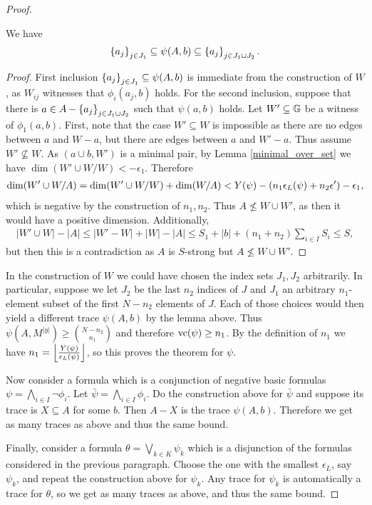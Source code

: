 \begin{proof}
  \begin{Lemma} We have
    \begin{align*}
      \left\{a_j\right\}_{j \in J_1} \subseteq \psi(A, b) \subseteq \left\{a_j\right\}_{j \in J_1 \cup J_2}.
    \end{align*}
  \end{Lemma}
  \begin{proof}
    First inclusion $\left\{a_j\right\}_{j \in J_1} \subseteq \psi(A, b)$ is immediate from the construction of $W$,
    as $W_{ij}$ witnesses that $\phi_i(a_j, b)$ holds.
    For the second inclusion, suppose that there is $a \in A - \left\{a_j\right\}_{j \in J_1 \cup J_2}$ such that $\psi(a,b)$ holds.
    Let $W' \subseteq \mathbb G$ be a witness of $\phi_1(a,b)$.
    First, note that the case $W' \subseteq W$ is impossible
    as there are no edges between $a$ and $W - a$, but there are edges between $a$ and $W' - a$.
    Thus assume $W' \not\subseteq W$.
    As $(a \cup b, W')$ is a minimal pair, by Lemma \ref{minimal_over_set} we have $\dim (W' \cup W / W) < -\epsilon_1$.
    Therefore
    \begin{align*}
      \dim(W' \cup W / A) = \dim (W' \cup W / W) + \dim(W/A) < Y(\psi) - \left(n_1 \epsilon_L(\psi) + n_2 \epsilon'\right) - \epsilon_1,
    \end{align*}
    which is negative by the construction of $n_1, n_2$.
    Thus $A \not\leq W \cup W'$, as then it would have a positive dimension.
    Additionally,
    \begin{align*}
      |W' \cup W| - |A| \leq |W' - W| + |W| - |A| \leq S_1 + |b| + (n_1 + n_2) \sum_{i \in I} S_i \leq S,
    \end{align*}
    but then this is a contradiction as $A$ is $S$-strong but $A \not\leq W \cup W'$.
  \end{proof}

  In the construction of $W$ we could have chosen the index sets $J_1, J_2$ arbitrarily.
  In particular, suppose we let $J_2$ be the last $n_2$ indices of $J$ and
  $J_1$ an arbitrary $n_1$-element subset of the first $N - n_2$ elements of $J$.
  Each of those choices would then yield a different trace $\psi(A, b)$ by the lemma above.
  Thus $\psi(A, M^{|y|}) \geq {N - n_2 \choose n_1}$ and therefore $\operatorname{vc}(\psi) \geq n_1$.
  By the definition of $n_1$ we have $n_1 = \left \lfloor \frac{Y(\psi)}{\epsilon_L(\psi)} \right \rfloor$, so this proves the theorem for $\psi$.
 
  Now consider a formula which is a conjunction of negative basic formulas $\psi = \bigwedge_{i \in I} \neg \phi_i$.
  Let $\bar \psi = \bigwedge_{i \in I} \phi_i$.
  Do the construction above for $\bar \psi$ and suppose its trace is $X \subseteq A$ for some $b$.
  Then $A - X$ is the trace $\psi(A, b)$.
  Therefore we get as many traces as above and thus the same bound.
  
  Finally, consider a formula $\theta = \bigvee_{k \in K} \psi_k$
  which is a disjunction of the formulas considered in the previous paragraph.
  Choose the one with the smallest $\epsilon_L$, say $\psi_k$, and repeat the construction above for $\psi_k$.
  Any trace for $\psi_k$ is automatically a trace for $\theta$, so we get as many traces as above, and thus the same bound.
\end{proof}

